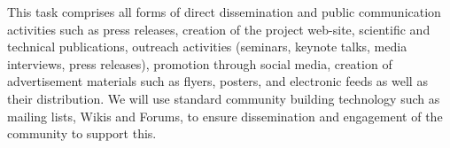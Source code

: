 \begin{task}[
  title=Dissemination and communication activities,
  id=Website,
  lead=SRL,
  PM=2,
  wphases={0-36!.027},
  partners={MP,UIO,QS}
]

This task comprises all forms of direct dissemination and public communication
activities such as press releases, creation of the project web-site, scientific
and technical publications, outreach activities (seminars, keynote talks, media
interviews, press releases), promotion through social media, creation of
advertisement materials such as flyers, posters, and electronic feeds as well as
their distribution. We will use standard community building technology such as
mailing lists, Wikis and Forums, to ensure dissemination and engagement of the
community to support this. 

\end{task}

